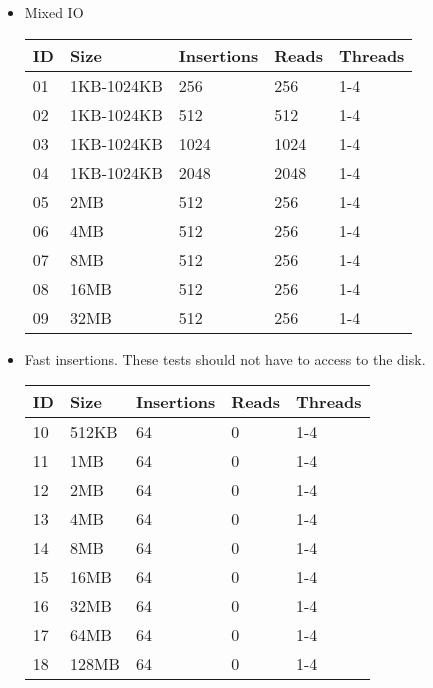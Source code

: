 \documentclass[11pt]{article}
\begin{document}
\begin{itemize}

\item Mixed IO
\begin{center}
    \begin{tabular}{| p{0.45cm} | p{2.5cm} | p{1.75cm} | p{1.25cm} | p{1.5cm} |}
    \hline
    ID & Size & Insertions & Reads & Threads
    \\ \hline
    01 & 1KB-1024KB & 256 & 256 & 1-4
    \\ \hline
    02 & 1KB-1024KB & 512 & 512 & 1-4
    \\ \hline
    03 & 1KB-1024KB & 1024 & 1024 & 1-4
    \\ \hline
    04 & 1KB-1024KB & 2048 & 2048 & 1-4
    \\ \hline
    05 & 2MB & 512 & 256 & 1-4
    \\ \hline
    06 & 4MB & 512 & 256 & 1-4
    \\ \hline
    07 & 8MB & 512 & 256 & 1-4
    \\ \hline
    08 & 16MB & 512 & 256 & 1-4
    \\ \hline
    09 & 32MB & 512 & 256 & 1-4
    \\ \hline
    \end{tabular}
\end{center}

\item Fast insertions. These tests should not have to access to the disk.
\begin{center}
    \begin{tabular}{| p{0.45cm} | p{2.5cm} | p{1.75cm} | p{1.25cm} | p{1.5cm} |}
    \hline
    ID & Size & Insertions & Reads & Threads
    \\ \hline
    10 & 512KB & 64 & 0 & 1-4
    \\ \hline
    11 & 1MB & 64 & 0 & 1-4
    \\ \hline
    12 & 2MB & 64 & 0 & 1-4
    \\ \hline
    13 & 4MB & 64 & 0 & 1-4
    \\ \hline
    14 & 8MB & 64 & 0 & 1-4
    \\ \hline
    15 & 16MB & 64 & 0 & 1-4
    \\ \hline
    16 & 32MB & 64 & 0 & 1-4
    \\ \hline
    17 & 64MB & 64 & 0 & 1-4
    \\ \hline
    18 & 128MB & 64 & 0 & 1-4
    \\ \hline
    \end{tabular}
\end{center}


\end{itemize}
\end{document}
